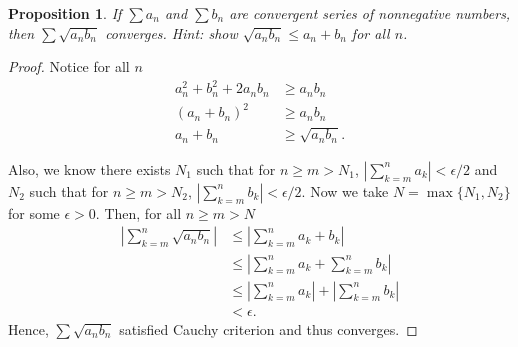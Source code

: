 \documentclass{article}
\newtheorem{proposition}[thm]{Proposition}
\begin{document}
\newpage
\begin{proposition}
    If $\sum a_n$ and $\sum b_n$ are convergent series of nonnegative numbers, then 
    $\sum\sqrt{a_nb_n}$ converges. Hint: show $\sqrt{a_nb_n}\le a_n+b_n$ for all $n$.
\end{proposition}
\begin{proof}
    Notice for all $n$
    \begin{align*}
        a_n^2 + b_n^2 + 2a_nb_n & \ge a_nb_n\\
        \left(a_n+b_n\right)^2 & \ge a_nb_n \\
        a_n + b_n & \ge \sqrt{a_nb_n}.
    \end{align*}

    Also, we know there exists $N_1$ such that for $n\ge m>N_1$, 
    $\left|\sum_{k=m}^na_k\right|<\epsilon/2$ and $N_2$ such that for $n\ge m>N_2$, 
    $\left|\sum_{k=m}^nb_k\right|<\epsilon/2$. Now we take $N = \max\{N_1,N_2\}$ for some 
    $\epsilon>0$. Then, for all $n\ge m>N$
    \begin{align*}
        \left|\sum_{k=m}^n\sqrt{a_nb_n}\right| & \le \left|\sum_{k=m}^{n}a_k+b_k\right| \\
        & \le \left|\sum_{k=m}^{n}a_k+\sum_{k=m}^{n}b_k\right| \\
        & \le \left|\sum_{k=m}^{n}a_k\right| + \left|\sum_{k=m}^{n}b_k\right| \\
        & < \epsilon.
    \end{align*}
    Hence, $\sum\sqrt{a_nb_n}$ satisfied Cauchy criterion and thus converges.
\end{proof}
\end{document}
